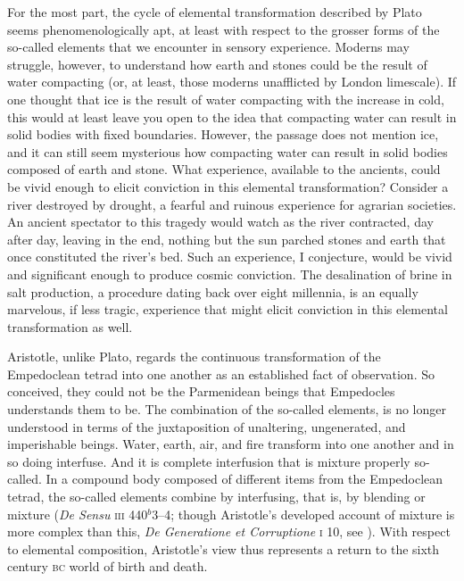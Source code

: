 For the most part, the cycle of elemental transformation described by Plato seems phenomenologically apt, at least with respect to the grosser forms of the so-called elements that we encounter in sensory experience. Moderns may struggle, however, to understand how earth and stones could be the result of water compacting (or, at least, those moderns unafflicted by London limescale). If one thought that ice is the result of water compacting with the increase in cold, this would at least leave you open to the idea that compacting water can result in solid bodies with fixed boundaries. However, the passage does not mention ice, and it can still seem mysterious how compacting water can result in solid bodies composed of earth and stone. What experience, available to the ancients, could be vivid enough to elicit conviction in this elemental transformation? Consider a river destroyed by drought, a fearful and ruinous experience for agrarian societies. An ancient spectator to this tragedy would watch as the river contracted, day after day, leaving in the end, nothing but the sun parched stones and earth that once constituted the river's bed. Such an experience, I conjecture, would be vivid and significant enough to produce cosmic conviction. The desalination of brine in salt production, a procedure dating back over eight millennia, is an equally marvelous, if less tragic, experience that might elicit conviction in this elemental transformation as well.

Aristotle, unlike Plato, regards the continuous transformation of the Empedoclean tetrad into one another as an established fact of observation. So conceived, they could not be the Parmenidean beings that Empedocles understands them to be. The combination of the so-called elements, is no longer understood in terms of the juxtaposition of unaltering, ungenerated, and imperishable beings. Water, earth, air, and fire transform into one another and in so doing interfuse. And it is complete interfusion that is mixture properly so-called. In a compound body composed of different items from the Empedoclean tetrad, the so-called elements combine by interfusing, that is, by blending or mixture (\emph{De Sensu} \textsc{iii} 440\( ^{b} \)3--4; though Aristotle's developed account of mixture is more complex than this, \emph{De Generatione et Corruptione} \textsc{i} 10, see \citealt{Cooper:2004fk}). With respect to elemental composition, Aristotle's view thus represents a return to the sixth century \textsc{bc} world of birth and death.

